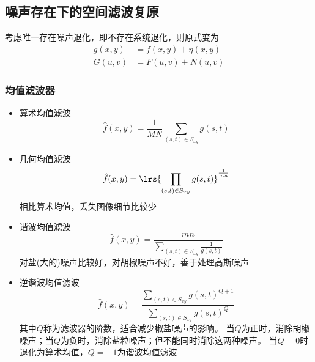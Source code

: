 \subsection{噪声存在下的空间滤波复原}
考虑唯一存在噪声退化，即不存在系统退化，则原式变为
\[\begin{aligned}
g(x,y)&=f(x,y)+\eta(x,y)\\
G(u,v)&=F(u,v)+N(u,v)
\end{aligned}\]

\subsubsection{均值滤波器}
\begin{itemize}
	\item 算术均值滤波
	\[\hat{f}(x,y)=\frac{1}{MN}\sum_{(s,t)\in S_{xy}}g(s,t)\]
	\item 几何均值滤波
	\[\hat{f}(x,y)=\lrs{\prod_{(s,t)\in S_{xy}}g(s,t)}^{\frac{1}{mn}}\]
	相比算术均值，丢失图像细节比较少
	\item 谐波均值滤波
	\[\hat{f}(x,y)=\frac{mn}{\sum_{(s,t)\in S_{xy}}\frac{1}{g(s,t)}}\]
	对盐(大的)噪声比较好，对胡椒噪声不好，善于处理高斯噪声
	\item 逆谐波均值滤波
	\[\hat{f}(x,y)=\frac{\sum_{(s,t)\in S_{xy}}g(s,t)^{Q+1}}{\sum_{(s,t)\in S_{xy}}g(s,t)^Q}\]
	其中$Q$称为滤波器的阶数，适合减少椒盐噪声的影响。
	当$Q$为正时，消除胡椒噪声；当$Q$为负时，消除盐粒噪声；但不能同时消除这两种噪声。
	当$Q=0$时退化为算术均值，$Q=-1$为谐波均值滤波
\end{itemize}